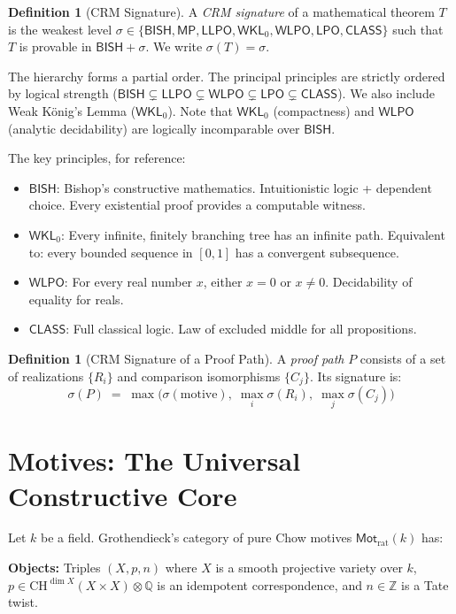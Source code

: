 \documentclass[11pt,a4paper]{article}
\theoremstyle{plain}
\theoremstyle{definition}
\newtheorem{definition}[theorem]{Definition}
\newcommand{\BISH}{\textsf{BISH}}
\newcommand{\WKL}{\textsf{WKL}_0}
\newcommand{\WLPO}{\textsf{WLPO}}
\newcommand{\LLPO}{\textsf{LLPO}}
\newcommand{\LPO}{\textsf{LPO}}
\newcommand{\CLASS}{\textsf{CLASS}}
\newcommand{\Mot}{\mathsf{Mot}}
\newcommand{\sig}{\sigma}
\newcommand{\Z}{\mathbb{Z}}
\newcommand{\Q}{\mathbb{Q}}
\begin{document}
\begin{definition}[CRM Signature]
A \emph{CRM signature} of a mathematical theorem $T$ is the weakest level $\sigma \in \{\BISH, \textsf{MP}, \LLPO, \WKL, \WLPO, \LPO, \CLASS\}$ such that $T$ is provable in $\BISH + \sigma$. We write $\sig(T) = \sigma$.
\end{definition}

The hierarchy forms a partial order. The principal principles are strictly ordered by logical strength ($\BISH \subsetneq \LLPO \subsetneq \WLPO \subsetneq \LPO \subsetneq \CLASS$). We also include Weak K\"onig's Lemma ($\WKL$). Note that $\WKL$ (compactness) and $\WLPO$ (analytic decidability) are logically incomparable over $\BISH$.

The key principles, for reference:
\begin{itemize}[leftmargin=2em]
\item $\BISH$: Bishop's constructive mathematics. Intuitionistic logic + dependent choice. Every existential proof provides a computable witness.
\item $\WKL$: Every infinite, finitely branching tree has an infinite path. Equivalent to: every bounded sequence in $[0,1]$ has a convergent subsequence.
\item $\WLPO$: For every real number $x$, either $x = 0$ or $x \neq 0$. Decidability of equality for reals.
\item $\CLASS$: Full classical logic. Law of excluded middle for all propositions.
\end{itemize}

\begin{definition}[CRM Signature of a Proof Path]
A \emph{proof path} $P$ consists of a set of realizations $\{R_i\}$ and comparison isomorphisms $\{C_j\}$. Its signature is:
\[
\sig(P) \;=\; \max\bigl(\sig(\text{motive}),\; \max_i \sig(R_i),\; \max_j \sig(C_j)\bigr)
\]
\end{definition}


\section{Motives: The Universal Constructive Core}\label{sec:motives}

Let $k$ be a field. Grothendieck's category of pure Chow motives $\Mot_{\mathrm{rat}}(k)$ has:

\textbf{Objects:} Triples $(X, p, n)$ where $X$ is a smooth projective variety over $k$, $p \in \mathrm{CH}^{\dim X}(X \times X) \otimes \Q$ is an idempotent correspondence, and $n \in \Z$ is a Tate twist.
\end{document}
